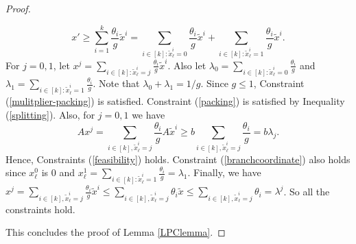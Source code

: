 \begin{proof}
\begin{cproof}
		\begin{equation}\label{splitting}
		x'\geq \sum_{i=1}^{k}\frac{\theta_i}{g} \tilde{x}^i
		={\sum_{i\in [k]: \tilde{x}^i_\ell =0}\frac{\theta_i}{g} \tilde{x}^i}+{\sum_{i\in [k]: \tilde{x}^i_\ell =1}\frac{\theta_i}{g} \tilde{x}^i}.
		\end{equation}
		For $j=0,1$, let $x^j = \sum_{i\in [k]:\tilde{x}^i_\ell=j} \frac{\theta_i}{g}\tilde{x}^i$. Also let $\lambda_0=\sum_{i\in [k]: \tilde{x}^i_\ell =0}\frac{\theta_i}{g}$ and $\lambda_1 = \sum_{i\in [k]: \tilde{x}^i_\ell =1}\frac{\theta_i}{g}$. Note that $\lambda_0+\lambda_1 =1/g$. Since $g\leq 1$, Constraint (\ref{mulitplier-packing}) is satisfied. Constraint (\ref{packing}) is satisfied by Inequality (\ref{splitting}). Also, for $j=0,1$ we have
		\begin{equation}
		Ax^j= \sum_{i\in[k], \tilde{x}^i_\ell = j} \frac{\theta_i}{g} A\tilde{x}^i  \geq b \sum_{i\in[k], \tilde{x}^i_\ell = j} \frac{\theta_i}{g} = b\lambda_j.
		\end{equation}
		Hence, Constraints (\ref{feasibility}) holds. Constraint (\ref{branchcoordinate}) also holds since $x^0_\ell$ is  $0$ and $x^1_\ell= \sum_{i\in [k]: \tilde{x}^i_\ell = 1}\frac{\theta_i}{g}= \lambda_1$. Finally, we have $x^j = \sum_{i\in[k], \tilde{x}^i_\ell = j} \frac{\theta_i}{g}\tilde{x}^i \leq \sum_{i\in[k], \tilde{x}^i_\ell = j}\theta_i\tilde{x}\leq \sum_{i\in[k], \tilde{x}^i_\ell = j}\theta_i = \lambda^j$. So all the constraints hold.
	\end{cproof}
	This concludes the proof of Lemma \ref{LPClemma}.	
\end{proof}

